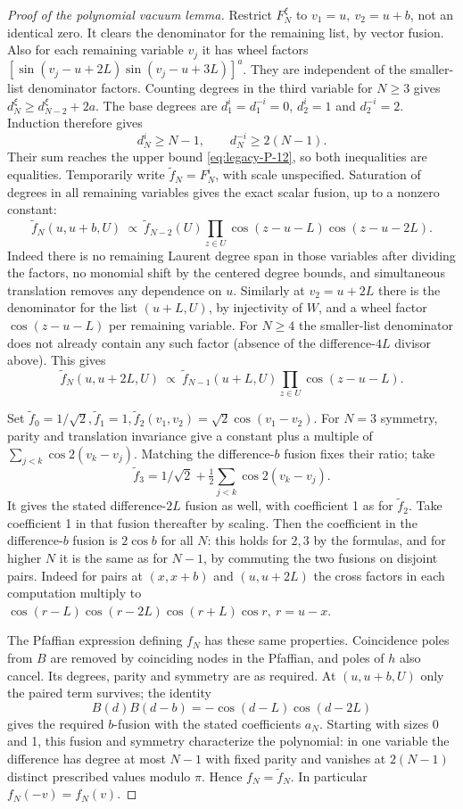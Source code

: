 \begin{proof}[Proof of the polynomial vacuum lemma]
Restrict \(F_N^\xi\) to \(v_1=u,\ v_2=u+b\), not an identical zero. It clears the denominator for the remaining list, by vector fusion. Also for each remaining variable \(v_j\) it has wheel factors \([\sin(v_j-u+2L)\sin(v_j-u+3L)]^a\). They are independent of the smaller-list denominator factors. Counting degrees in the third variable for \(N\ge3\) gives \(d_N^\xi\ge d_{N-2}^\xi+2a\). The base degrees are \(d_1^i=d_1^{-i}=0\), \(d_2^i=1\) and \(d_2^{-i}=2\). Induction therefore gives
\[
 d_N^i\ge N-1,\qquad d_N^{-i}\ge2(N-1).
\]
Their sum reaches the upper bound \eqref{eq:legacy-P-12}, so both inequalities are equalities. Temporarily write \(\widetilde f_N=F_N^i\), with scale unspecified. Saturation of degrees in all remaining variables gives the exact scalar fusion, up to a nonzero constant:
\[
 \widetilde f_N(u,u+b,U)\ \propto\ \widetilde f_{N-2}(U)\prod_{z\in U}\cos(z-u-L)\cos(z-u-2L).
\]
Indeed there is no remaining Laurent degree span in those variables after dividing the factors, no monomial shift by the centered degree bounds, and simultaneous translation removes any dependence on \(u\). Similarly at \(v_2=u+2L\) there is the denominator for the list \((u+L,U)\), by injectivity of \(W\), and a wheel factor \(\cos(z-u-L)\) per remaining variable. For \(N\ge4\) the smaller-list denominator does not already contain any such factor (absence of the difference-\(4L\) divisor above). This gives
\[
 \widetilde f_N(u,u+2L,U)\ \propto\ \widetilde f_{N-1}(u+L,U)\prod_{z\in U}\cos(z-u-L).
\]

Set \(\widetilde f_0=1/\sqrt2, \widetilde f_1=1, \widetilde f_2(v_1,v_2)=\sqrt2\cos(v_1-v_2)\). For \(N=3\) symmetry, parity and translation invariance give a constant plus a multiple of \(\sum_{j<k}\cos 2(v_k-v_j)\). Matching the difference-\(b\) fusion fixes their ratio; take
\[
 \widetilde f_3=1/\sqrt2+\tfrac12\sum_{j<k}\cos 2(v_k-v_j).
\]
It gives the stated difference-\(2L\) fusion as well, with coefficient 1 as for \(\widetilde f_2\). Take coefficient 1 in that fusion thereafter by scaling. Then the coefficient in the difference-\(b\) fusion is \(2\cos b\) for all \(N\): this holds for \(2,3\) by the formulas, and for higher \(N\) it is the same as for \(N-1\), by commuting the two fusions on disjoint pairs. Indeed for pairs at \((x,x+b)\) and \((u,u+2L)\) the cross factors in each computation multiply to \(\cos(r-L)\cos(r-2L)\cos(r+L)\cos r,\ r=u-x\).

The Pfaffian expression defining \(f_N\) has these same properties. Coincidence poles from \(B\) are removed by coinciding nodes in the Pfaffian, and poles of \(h\) also cancel. Its degrees, parity and symmetry are as required. At \((u,u+b,U)\) only the paired term survives; the identity
\[
 B(d)B(d-b)=-\cos(d-L)\cos(d-2L)
\]
gives the required \(b\)-fusion with the stated coefficients \(a_N\). Starting with sizes 0 and 1, this fusion and symmetry characterize the polynomial: in one variable the difference has degree at most \(N-1\) with fixed parity and vanishes at \(2(N-1)\) distinct prescribed values modulo \(\pi\). Hence \(f_N=\widetilde f_N\). In particular \(f_N(-v)=f_N(v)\).


\end{proof}
